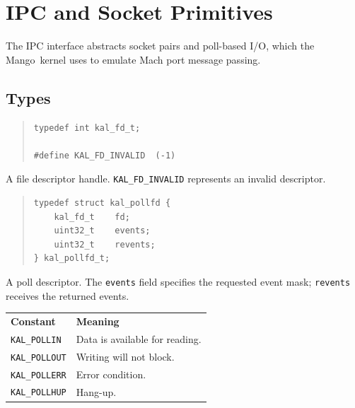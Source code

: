 \documentclass[11pt,twoside]{article}
\newcommand{\Mango}{Mango}
\begin{document}
\newpage
\section{IPC and Socket Primitives}
\label{sec:ipc}

The IPC interface abstracts socket pairs and poll-based I/O, which
the \Mango\ kernel uses to emulate Mach port message passing.

\subsection{Types}

\begin{quote}
\begin{verbatim}
typedef int kal_fd_t;

#define KAL_FD_INVALID  (-1)
\end{verbatim}
\end{quote}

A file descriptor handle.  {\tt KAL\_FD\_INVALID} represents an
invalid descriptor.

\begin{quote}
\begin{verbatim}
typedef struct kal_pollfd {
    kal_fd_t    fd;
    uint32_t    events;
    uint32_t    revents;
} kal_pollfd_t;
\end{verbatim}
\end{quote}

A poll descriptor.  The {\tt events} field specifies the requested
event mask; {\tt revents} receives the returned events.

\medskip
\noindent
\begin{tabularx}{\textwidth}{lX}
{\bf Constant} & {\bf Meaning} \\[2pt]
{\tt KAL\_POLLIN}  & Data is available for reading. \\
{\tt KAL\_POLLOUT} & Writing will not block. \\
{\tt KAL\_POLLERR} & Error condition. \\
{\tt KAL\_POLLHUP} & Hang-up. \\
\end{tabularx}

\end{document}
